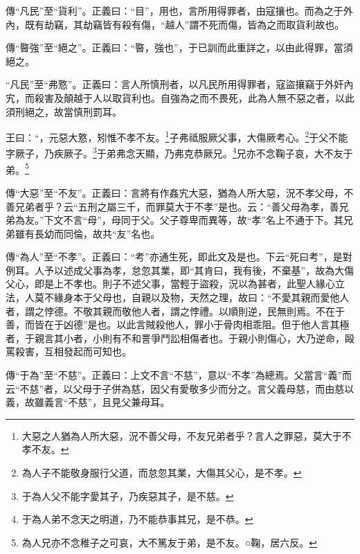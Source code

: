 {\noindent\zhuan{}\fzbyks 傳“凡民”至“貨利”。正義曰：“目”，用也，言所用得罪者，由寇攘也。而為之于外內，既有劫竊，其劫竊皆有殺有傷，“越人”謂不死而傷，皆為之而取貨利故也。 \par}

{\noindent\zhuan{}\fzbyks 傳“暋強”至“絕之”。正義曰：“暋，強也”，于已訓而此重詳之，以由此得罪，當須絕之。 \par}

{\noindent\shu{}\fzkt “凡民”至“弗憝”。正義曰：言人所慎刑者，以凡民所用得罪者，寇盜攘竊于外奸內宄，而殺害及顛越于人以取貨利也。自強為之而不畏死，此為人無不惡之者，以此須刑絕之，故當慎刑罰耳。 \par}

王曰：“，元惡大憝，矧惟不孝不友。\footnote{大惡之人猶為人所大惡，況不善父母，不友兄弟者乎？言人之罪惡，莫大于不孝不友。}子弗祗服厥父事，大傷厥考心。\footnote{為人子不能敬身服行父道，而怠忽其業，大傷其父心，是不孝。}于父不能字厥子，乃疾厥子。\footnote{于為人父不能字愛其子，乃疾惡其子，是不慈。}于弟弗念天顯，乃弗克恭厥兄。\footnote{于為人弟不念天之明道，乃不能恭事其兄，是不恭。}兄亦不念鞠子哀，大不友于弟。\footnote{為人兄亦不念稚子之可哀，大不篤友于弟，是不友。○鞠，居六反。}


{\noindent\zhuan{}\fzbyks 傳“大惡”至“不友”。正義曰：言將有作姦宄大惡，猶為人所大惡，況不孝父母，不善兄弟者乎？云“五刑之屬三千，而罪莫大于不孝”是也。云：“善父母為孝，善兄弟為友。”下文不言“母”，母同于父。父子尊卑而異等，故“孝”名上不通于下。其兄弟雖有長幼而同倫，故共“友”名也。 \par}

{\noindent\zhuan{}\fzbyks 傳“為人”至“不孝”。正義曰：“考”亦通生死，即此文及是也。下云“死曰考”，是對例耳。人予以述成父事為孝，怠忽其業，即“其肯曰，我有後，不棄基”，故為大傷父心，即是上不孝也。則子不述父事，當輕于盜殺，況以為甚者，此聖人緣心立法，人莫不緣身本于父母也，自親以及物，天然之理，故曰：“不愛其親而愛他人者，謂之悖德。不敬其親而敬他人者，謂之悖禮。以順則逆，民無則焉。不在于善，而皆在于凶德”是也。以此言賊殺他人，罪小于骨肉相乖阻。但于他人言其極者，于親言其小者，小則有不和詈爭鬥訟相傷者也。于親小則傷心，大乃逆命，毆罵殺害，互相發起而可知也。 \par}

{\noindent\zhuan{}\fzbyks 傳“于為”至“不慈”。正義曰：上文不言“不慈”，意以“不孝”為總焉。父當言“義”而云“不慈”者，以父母于子併為慈，因父有愛敬多少而分之。言父義母慈，而由慈以義，故雖義言“不慈”，且見父兼母耳。 \par}


